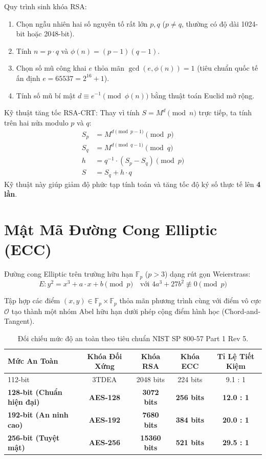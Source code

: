 Quy trình sinh khóa RSA:
\begin{enumerate}
  \item Chọn ngẫu nhiên hai số nguyên tố rất lớn $p, q$ ($p \ne q$, thường có độ dài 1024-bit hoặc 2048-bit).
  \item Tính $n = p \cdot q$ và $\phi(n) = (p - 1)(q - 1)$.
  \item Chọn số mũ công khai $e$ thỏa mãn $\gcd(e, \phi(n)) = 1$ (tiêu chuẩn quốc tế ấn định $e = 65537 = 2^{16} + 1$).
  \item Tính số mũ bí mật $d \equiv e^{-1} \pmod{\phi(n)}$ bằng thuật toán Euclid mở rộng.
\end{enumerate}

Kỹ thuật tăng tốc RSA-CRT: Thay vì tính $S = M^d \pmod n$ trực tiếp, ta tính trên hai nửa modulo $p$ và $q$:
\begin{align}
S_p &= M^{d \pmod{p-1}} \pmod p\\
S_q &= M^{d \pmod{q-1}} \pmod q\\
h &= q^{-1} \cdot (S_p - S_q) \pmod p\\
S &= S_q + h \cdot q
\end{align}
Kỹ thuật này giúp giảm độ phức tạp tính toán và tăng tốc độ ký số thực tế lên \textbf{4 lần}.

\section{Mật Mã Đường Cong Elliptic (ECC)}

Đường cong Elliptic trên trường hữu hạn $\mathbb{F}_p$ ($p > 3$) dạng rút gọn Weierstrass:
\begin{equation}
E: y^2 = x^3 + a \cdot x + b \pmod p \quad \text{với } 4a^3 + 27b^2 \not\equiv 0 \pmod p
\end{equation}

Tập hợp các điểm $(x, y) \in \mathbb{F}_p \times \mathbb{F}_p$ thỏa mãn phương trình cùng với điểm vô cực $\mathcal{O}$ tạo thành một nhóm Abel hữu hạn dưới phép cộng điểm hình học (Chord-and-Tangent).

\begin{table}[h]
\centering\small
\begin{tabularx}{\linewidth}{@{}l c c c c@{}}
\toprule
\textbf{Mức An Toàn} & \textbf{Khóa Đối Xứng} & \textbf{Khóa RSA} & \textbf{Khóa ECC} & \textbf{Tỉ Lệ Tiết Kiệm} \\
\midrule
112-bit & 3TDEA & 2048 bits & 224 bits & 9.1 : 1 \\
\textbf{128-bit (Chuẩn hiện đại)} & \textbf{AES-128} & \textbf{3072 bits} & \textbf{256 bits} & \textbf{12.0 : 1} \\
\textbf{192-bit (An ninh cao)} & \textbf{AES-192} & \textbf{7680 bits} & \textbf{384 bits} & \textbf{20.0 : 1} \\
\textbf{256-bit (Tuyệt mật)} & \textbf{AES-256} & \textbf{15360 bits} & \textbf{521 bits} & \textbf{29.5 : 1} \\
\bottomrule
\end{tabularx}
\caption{Đối chiếu mức độ an toàn theo tiêu chuẩn NIST SP 800-57 Part 1 Rev 5.}
\end{table}

